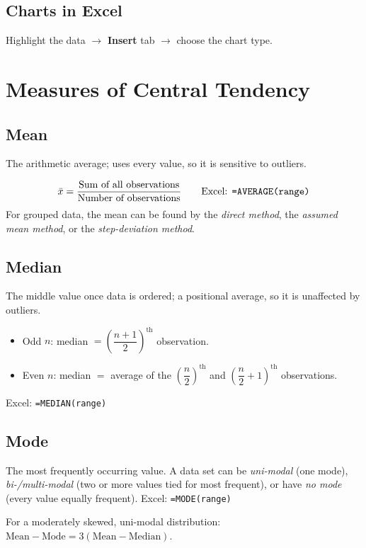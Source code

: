 \documentclass[11pt]{article}
\begin{document}
	\subsection{Charts in Excel}
	Highlight the data $\rightarrow$ \textbf{Insert} tab $\rightarrow$ choose the chart type.
	
	\section{Measures of Central Tendency}
	
	\subsection{Mean}
	The arithmetic average; uses every value, so it is sensitive to outliers.
	
	\begin{formulabox}
		\[
		\bar{x} = \frac{\text{Sum of all observations}}{\text{Number of observations}} \qquad \text{Excel: \texttt{=AVERAGE(range)}}
		\]
		For grouped data, the mean can be found by the \emph{direct method}, the \emph{assumed mean method}, or the \emph{step-deviation method}.
	\end{formulabox}
	
	\subsection{Median}
	The middle value once data is ordered; a positional average, so it is unaffected by outliers.
	\begin{itemize}[leftmargin=*]
		\item Odd $n$: median $= \left(\dfrac{n+1}{2}\right)^{\text{th}}$ observation.
		\item Even $n$: median $=$ average of the $\left(\dfrac{n}{2}\right)^{\text{th}}$ and $\left(\dfrac{n}{2}+1\right)^{\text{th}}$ observations.
	\end{itemize}
	Excel: \texttt{=MEDIAN(range)}
	
	\subsection{Mode}
	The most frequently occurring value. A data set can be \emph{uni-modal} (one mode), \emph{bi-/multi-modal} (two or more values tied for most frequent), or have \emph{no mode} (every value equally frequent).
	Excel: \texttt{=MODE(range)}
	
	\begin{notebox}
		For a moderately skewed, uni-modal distribution: $\text{Mean} - \text{Mode} = 3(\text{Mean} - \text{Median})$.
	\end{notebox}
	
\end{document}
